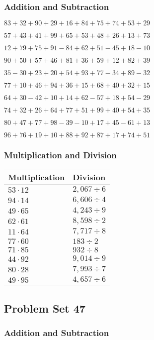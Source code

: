 \hypertarget{addition-and-subtraction-86}{%
\subsubsection{Addition and
Subtraction}\label{addition-and-subtraction-86}}

\(83+32+90+29+16+84+75+74+53+ 29\)

\(57+43+41+99+65+53+48+26+13+73\)

\(12+79+75+91-84+62+51-45+18-10\)

\(90+50+57+46+81+36+59+12+82+39\)

\(35-30+23+20+54+93+77-34+89-32\)

\(77+10+46+94+36+15+68+40+32+15\)

\(64+30-42+10+14+62-57+18+54-29\)

\(74+32+26+64+77+51+99+40+54+35\)

\(80+47+77+98-39-10+17+45-61+13\)

\(96+76+19+10+88+92+87+17+74+51\)

\hypertarget{multiplication-and-division-86}{%
\subsubsection{Multiplication and
Division}\label{multiplication-and-division-86}}

\begin{longtable}[]{@{}ll@{}}
\toprule
Multiplication & Division\tabularnewline
\midrule
\endhead
\(53\cdot12\) & \(2,067÷6\)\tabularnewline
\(94\cdot14\) & \(6,606÷4\)\tabularnewline
\(49\cdot65\) & \(4,243÷9\)\tabularnewline
\(62\cdot61\) & \(8,598÷2\)\tabularnewline
\(11\cdot64\) & \(7,717÷8\)\tabularnewline
\(77\cdot60\) & \(183÷2\)\tabularnewline
\(71\cdot85\) & \(932÷8\)\tabularnewline
\(44\cdot92\) & \(9,014÷9\)\tabularnewline
\(80\cdot28\) & \(7,993÷7\)\tabularnewline
\(49\cdot95\) & \(4,657÷6\)\tabularnewline
\bottomrule
\end{longtable}

\hypertarget{problem-set-47}{%
\subsection{Problem Set 47}\label{problem-set-47}}

\hypertarget{addition-and-subtraction-87}{%
\subsubsection{Addition and
Subtraction}\label{addition-and-subtraction-87}}

